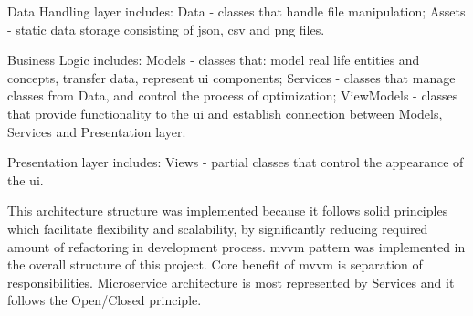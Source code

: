 \noindent Data Handling layer includes: Data - classes that handle file manipulation; Assets - static data storage consisting of \acrshort{json}, \acrshort{csv} and \acrshort{png} files.

\noindent Business Logic includes: Models - classes that: model real life entities and concepts, transfer data, represent \acrshort{ui} components; Services - classes that manage classes from Data, and control the process of optimization; ViewModels - classes that provide functionality to the \acrshort{ui} and establish connection between Models, Services and Presentation layer.

\noindent Presentation layer includes: Views - partial classes that control the appearance of the \acrshort{ui}.

\noindent This architecture structure was implemented because it follows \acrshort{solid} principles which facilitate flexibility and scalability, by significantly reducing required amount of refactoring in development process. \acrshort{mvvm} pattern was implemented in the overall structure of this project. Core benefit of \acrshort{mvvm} is separation of responsibilities. Microservice architecture is most represented by Services and it follows the Open/Closed principle.
